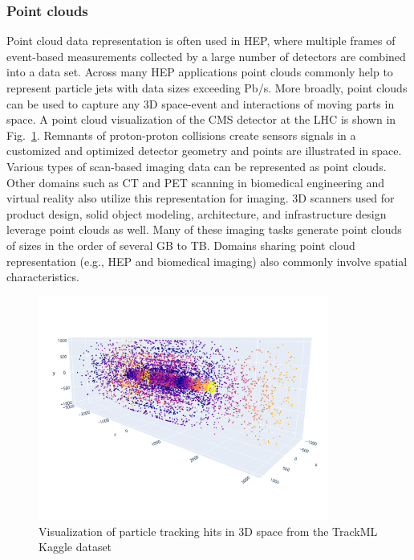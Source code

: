 \subsubsection{Point clouds}
 Point cloud data representation is often used in HEP, where multiple frames of event-based measurements collected by a large number of detectors are combined into a data set. Across many HEP applications point clouds commonly help to represent particle jets with data sizes exceeding Pb/s. More broadly, point clouds can be used to capture any 3D space-event and interactions of moving parts in space. A point cloud visualization of the CMS detector at the LHC is shown in Fig.~\ref{fig:repcloud}.  Remnants of proton-proton collisions create sensors signals in a customized and optimized detector geometry and points are illustrated in space. Various types of scan-based imaging data can be represented as point clouds. Other domains such as CT and PET scanning in biomedical engineering and virtual reality also utilize this representation for imaging. 3D scanners used for product design, solid object modeling, architecture, and infrastructure design leverage point clouds as well. Many of these imaging tasks generate point clouds of sizes in the order of several GB to TB. Domains sharing point cloud representation (e.g., HEP and biomedical imaging) also commonly involve spatial characteristics. 
 \begin{figure}[tbh!]
     \centering
     \includegraphics[width=0.85\textwidth]{figures/kaggle-tracking.pdf}
     \caption{Visualization of particle tracking hits in 3D space from the TrackML Kaggle dataset~\cite{cmseventdisplay}}
     \label{fig:repcloud}
 \end{figure}
 
